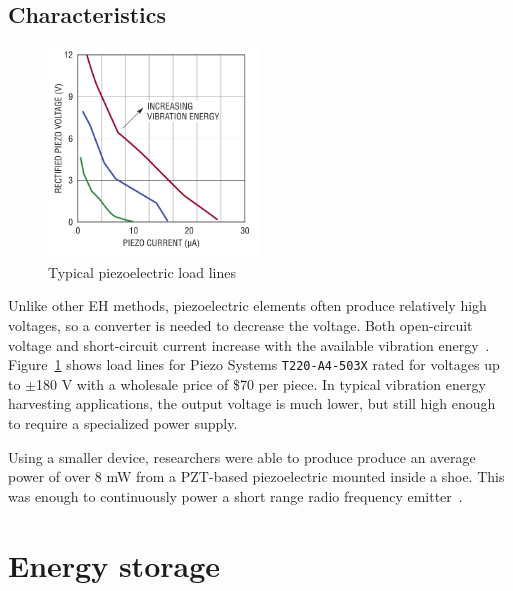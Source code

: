 \documentclass[a4paper,10pt]{article}
\begin{document}
\subsection{Characteristics}

\begin{figure}[h!]
\centering
  \includegraphics[width=0.5\textwidth]{./Slike/Piezo-UI}
\caption{Typical piezoelectric load lines~\cite{LT-Piezo}}
\label{fig:piezo-load}
\end{figure}

Unlike other \ac{EH} methods, piezoelectric elements often produce relatively high voltages, so a converter is needed to decrease the voltage. Both open-circuit voltage and short-circuit current increase with the available vibration energy~\cite{LT-Piezo}. Figure~\ref{fig:piezo-load} shows load lines for Piezo Systems \texttt{T220-A4-503X} rated for voltages up to $\pm$180 V with a wholesale price of \$70 per piece. In typical vibration energy harvesting applications, the output voltage is much lower, but still high enough to require a specialized power supply. 

Using a smaller device, researchers were able to produce produce an average power of over 8 mW from a \ac{PZT}-based piezoelectric mounted inside a shoe. This was enough to continuously power a short range radio frequency emitter~\cite{piezo-shoe-ieee}. 


\section{Energy storage}
\end{document}

